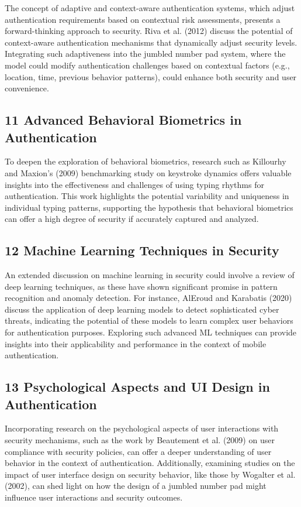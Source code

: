 \documentclass{article}
\begin{document}
The concept of adaptive and context-aware authentication systems, which adjust authentication requirements based on contextual risk assessments, presents a forward-thinking approach to security. Riva et al. (2012) discuss the potential of context-aware authentication mechanisms that dynamically adjust security levels. Integrating such adaptiveness into the jumbled number pad system, where the model could modify authentication challenges based on contextual factors (e.g., location, time, previous behavior patterns), could enhance both security and user convenience.

\subsection*{11 Advanced Behavioral Biometrics in Authentication}

To deepen the exploration of behavioral biometrics, research such as Killourhy and Maxion's (2009) benchmarking study on keystroke dynamics offers valuable insights into the effectiveness and challenges of using typing rhythms for authentication. This work highlights the potential variability and uniqueness in individual typing patterns, supporting the hypothesis that behavioral biometrics can offer a high degree of security if accurately captured and analyzed.

\subsection*{12 Machine Learning Techniques in Security}

An extended discussion on machine learning in security could involve a review of deep learning techniques, as these have shown significant promise in pattern recognition and anomaly detection. For instance, AlEroud and Karabatis (2020) discuss the application of deep learning models to detect sophisticated cyber threats, indicating the potential of these models to learn complex user behaviors for authentication purposes. Exploring such advanced ML techniques can provide insights into their applicability and performance in the context of mobile authentication.

\subsection*{13 Psychological Aspects and UI Design in Authentication}

Incorporating research on the psychological aspects of user interactions with security mechanisms, such as the work by Beautement et al. (2009) on user compliance with security policies, can offer a deeper understanding of user behavior in the context of authentication. Additionally, examining studies on the impact of user interface design on security behavior, like those by Wogalter et al. (2002), can shed light on how the design of a jumbled number pad might influence user interactions and security outcomes.
\end{document}

